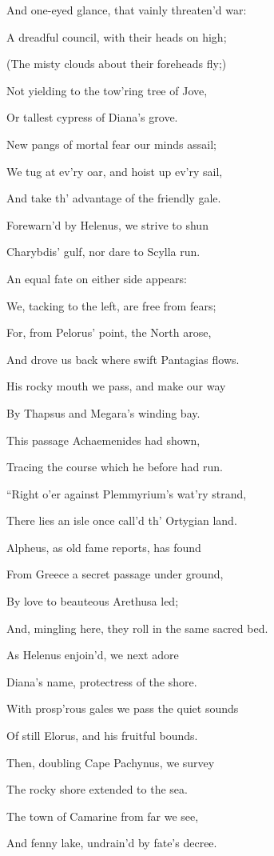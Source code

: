 And one-eyed glance, that vainly threaten’d war:

A dreadful council, with their heads on high;

(The misty clouds about their foreheads fly;)

Not yielding to the tow’ring tree of Jove,

Or tallest cypress of Diana’s grove.

New pangs of mortal fear our minds assail;

We tug at ev’ry oar, and hoist up ev’ry sail,

And take th’ advantage of the friendly gale.

Forewarn’d by Helenus, we strive to shun

Charybdis’ gulf, nor dare to Scylla run.

An equal fate on either side appears:

We, tacking to the left, are free from fears;

For, from Pelorus’ point, the North arose,

And drove us back where swift Pantagias flows.

His rocky mouth we pass, and make our way

By Thapsus and Megara’s winding bay.

This passage Achaemenides had shown,

Tracing the course which he before had run.

“Right o’er against Plemmyrium’s wat’ry strand,

There lies an isle once call’d th’ Ortygian land.

Alpheus, as old fame reports, has found

From Greece a secret passage under ground,

By love to beauteous Arethusa led;

And, mingling here, they roll in the same sacred bed.

As Helenus enjoin’d, we next adore

Diana’s name, protectress of the shore.

With prosp’rous gales we pass the quiet sounds

Of still Elorus, and his fruitful bounds.

Then, doubling Cape Pachynus, we survey

The rocky shore extended to the sea.

The town of Camarine from far we see,

And fenny lake, undrain’d by fate’s decree.

